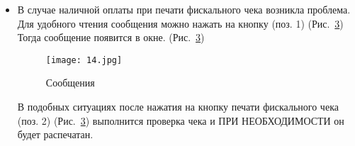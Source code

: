\begin{itemize}
	\begin{figure}[h]
		\texttt{[image: 12.jpg]}
		\caption{Работа с чеком}
		\label{ris:12.jpg}
	\end{figure}	
	

	После  выбора формы оплаты выбрать требуемую сумму (поз. 1) (Рис.~\ref{ris:12.jpg}), провести и закрыть документ нажав кнопку <<Провести и закрыть>>. (поз. 2) (Рис.~\ref{ris:12.jpg}).

	Далее, после закрытия формы чека программа вернется в форму списка чеков (Рис.~\ref{ris:13.jpg}).
		\newpage
	\begin{figure}[H]
		\texttt{[image: 13.jpg]}
		\caption{Форма списка}
		\label{ris:13.jpg}
	\end{figure}	
	В открывшейся форме (Рис.~\ref{ris:13.jpg}) нажать на кнопку пробития чека. Чек будет распечатан на фискальном регистраторе
\subsection{Чек не вышел после нажатия <<Оплата>> (наличные)}	
	\item В случае наличной оплаты при печати фискального чека возникла проблема.
	Для удобного чтения сообщения можно нажать на кнопку (поз. 1) (Рис.~\ref{ris:14.jpg}) Тогда сообщение появится в окне. (Рис.~\ref{ris:14.jpg})
	
	\begin{figure}[H]
		\texttt{[image: 14.jpg]}
		\caption{Сообщения}
		\label{ris:14.jpg}
	\end{figure}		
	В подобных ситуациях после нажатия на кнопку печати фискального чека (поз. 2) (Рис.~\ref{ris:14.jpg}) выполнится проверка чека и ПРИ НЕОБХОДИМОСТИ он будет распечатан.
	
\end{itemize}
